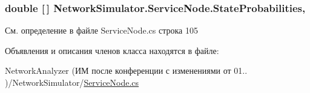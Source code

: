 \subsubsection[{\texorpdfstring{State\+Probabilities}{StateProbabilities}}]{\setlength{\rightskip}{0pt plus 5cm}double \mbox{[}$\,$\mbox{]} Network\+Simulator.\+Service\+Node.\+State\+Probabilities\hspace{0.3cm}{\ttfamily [get]}, {\ttfamily [set]}}\hypertarget{class_network_simulator_1_1_service_node_a8fd15687cf3bbfc3e3e48b54d17c4d6e}{}\label{class_network_simulator_1_1_service_node_a8fd15687cf3bbfc3e3e48b54d17c4d6e}


См. определение в файле Service\+Node.\+cs строка 105



Объявления и описания членов класса находятся в файле\+:\begin{DoxyCompactItemize}
\item 
Network\+Analyzer (ИМ после конференции  с изменениями от 01.. )/\+Network\+Simulator/\hyperlink{_service_node_8cs}{Service\+Node.\+cs}\end{DoxyCompactItemize}

